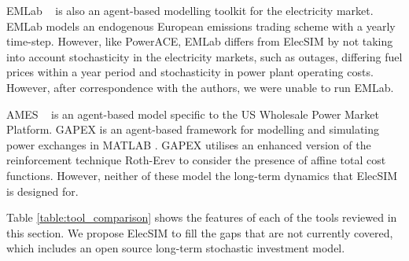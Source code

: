 EMLab ~\cite{Chappin2017} is also an agent-based modelling toolkit for the electricity market. EMLab models an endogenous European emissions trading scheme with a yearly time-step. However, like PowerACE, EMLab differs from ElecSIM by not taking into account stochasticity in the electricity markets, such as outages, differing fuel prices within a year period and stochasticity in power plant operating costs. However, after correspondence with the authors, we were unable to run EMLab.

AMES ~\cite{Sun2007} is an agent-based model specific to the US Wholesale Power Market Platform. GAPEX \cite{Cincotti2013} is an agent-based framework for modelling and simulating power exchanges in MATLAB . GAPEX utilises an enhanced version of the reinforcement technique Roth-Erev to consider the presence of affine total cost functions. However, neither of these model the long-term dynamics that ElecSIM is designed for.

Table \ref{table:tool_comparison} shows the features of each of the tools reviewed in this section. We propose ElecSIM to fill the gaps that are not currently covered, which includes an open source long-term stochastic investment model. 





